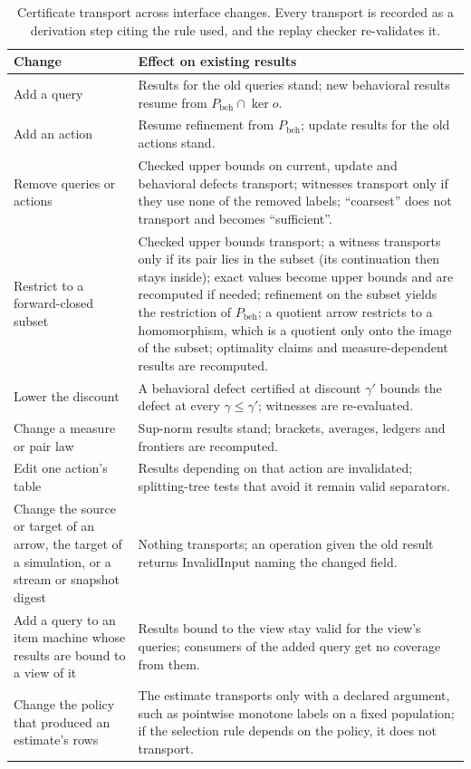 \documentclass[11pt]{article}
\newcommand{\Pbeh}{P_{\mathrm{beh}}}
\theoremstyle{definition}
\theoremstyle{plain}
\begin{document}
\begin{table}[ht]
\centering\small
\begin{tabularx}{\textwidth}{>{\raggedright\arraybackslash}p{3.2cm}>{\raggedright\arraybackslash}X}
\toprule
Change & Effect on existing results\\
\midrule
Add a query & Results for the old queries stand; new behavioral results resume from $\Pbeh\cap\ker o$.\\
Add an action & Resume refinement from $\Pbeh$; update results for the old actions stand.\\
Remove queries or actions & Checked upper bounds on current, update and behavioral defects transport; witnesses transport only if they use none of the removed labels; ``coarsest'' does not transport and becomes ``sufficient''.\\
Restrict to a forward-closed subset & Checked upper bounds transport; a witness transports only if its pair lies in the subset (its continuation then stays inside); exact values become upper bounds and are recomputed if needed; refinement on the subset yields the restriction of $\Pbeh$; a quotient arrow restricts to a homomorphism, which is a quotient only onto the image of the subset; optimality claims and measure-dependent results are recomputed.\\
Lower the discount & A behavioral defect certified at discount $\gamma'$ bounds the defect at every $\gamma\le\gamma'$; witnesses are re-evaluated.\\
Change a measure or pair law & Sup-norm results stand; brackets, averages, ledgers and frontiers are recomputed.\\
Edit one action's table & Results depending on that action are invalidated; splitting-tree tests that avoid it remain valid separators.\\
Change the source or target of an arrow, the target of a simulation, or a stream or snapshot digest & Nothing transports; an operation given the old result returns InvalidInput naming the changed field.\\
Add a query to an item machine whose results are bound to a view of it & Results bound to the view stay valid for the view's queries; consumers of the added query get no coverage from them.\\
Change the policy that produced an estimate's rows & The estimate transports only with a declared argument, such as pointwise monotone labels on a fixed population; if the selection rule depends on the policy, it does not transport.\\
\bottomrule
\end{tabularx}
\caption{Certificate transport across interface changes. Every transport is recorded as a
derivation step citing the rule used, and the replay checker re-validates it.}\label{tab:transport}
\end{table}
\end{document}
